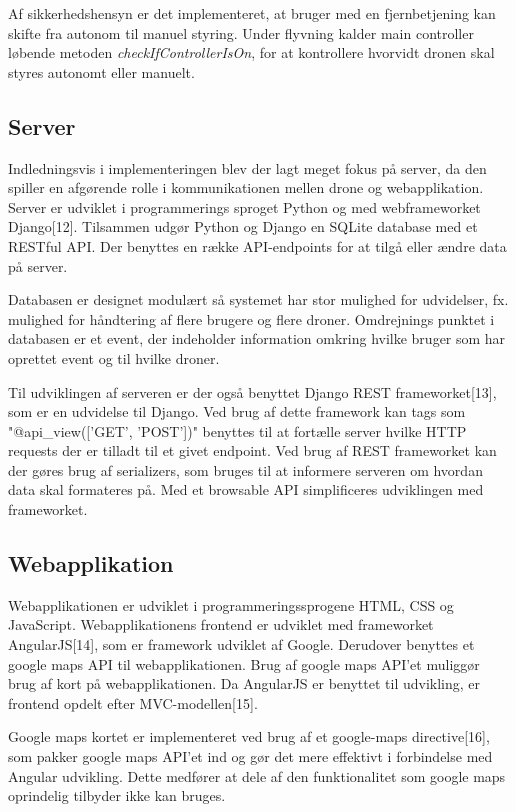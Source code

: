 Af sikkerhedshensyn er det implementeret, at bruger med en fjernbetjening kan skifte fra autonom til manuel styring. Under flyvning kalder main controller løbende metoden \textit{checkIfControllerIsOn}, for at kontrollere hvorvidt dronen skal styres autonomt eller manuelt.  

\subsection{Server}
Indledningsvis i implementeringen blev der lagt meget fokus på server, da den spiller en afgørende rolle i kommunikationen mellen drone og webapplikation. 
Server er udviklet i programmerings sproget Python og med webframeworket Django[12].
Tilsammen udgør Python og Django en SQLite database med et RESTful API. Der benyttes en række API-endpoints for at tilgå eller ændre data på server.

Databasen er designet modulært så systemet har stor mulighed for udvidelser, fx. mulighed for håndtering af flere brugere og flere droner. Omdrejnings punktet i databasen er et event, der indeholder information omkring hvilke bruger som har oprettet event og til hvilke droner.

Til udviklingen af serveren er der også benyttet Django REST frameworket[13], som er en udvidelse til Django. Ved brug af dette framework kan tags som "@api\_view(['GET', 'POST'])" benyttes til at fortælle server hvilke HTTP requests der er tilladt til et givet endpoint. 
Ved brug af REST frameworket kan der gøres brug af serializers, som bruges til at informere  serveren om hvordan data skal formateres på. Med et browsable API simplificeres udviklingen med frameworket.

\newpage
\subsection{Webapplikation}
Webapplikationen  er udviklet i programmeringssprogene HTML, CSS og JavaScript. Webapplikationens frontend er udviklet med frameworket AngularJS[14], som er framework udviklet af Google. Derudover benyttes et google maps API til webapplikationen. Brug af google maps API'et muliggør brug af kort på webapplikationen. Da AngularJS er benyttet til udvikling, er frontend opdelt efter MVC-modellen[15]. 

Google maps kortet er implementeret ved brug af et google-maps directive[16], som pakker google maps API'et ind og gør det mere effektivt i forbindelse med Angular udvikling. Dette medfører at dele af den funktionalitet som google maps oprindelig tilbyder ikke kan bruges. 

